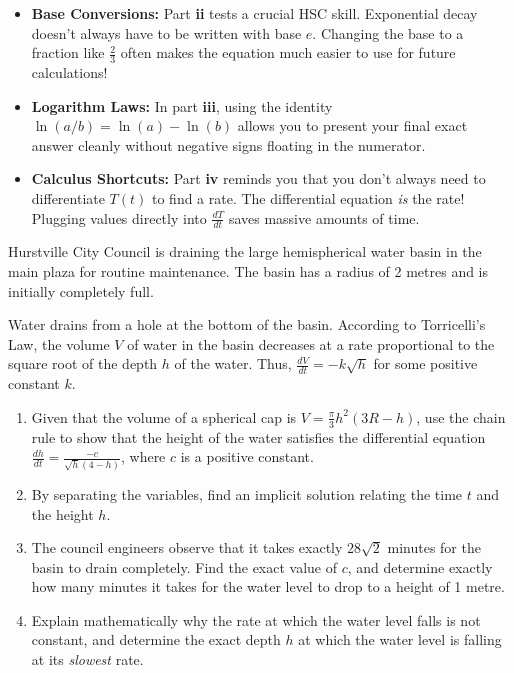 \begin{takeaways}
\begin{itemize}[leftmargin=*]
    \item \textbf{Base Conversions:} Part \textbf{ii} tests a crucial HSC skill. Exponential decay doesn't always have to be written with base $e$. Changing the base to a fraction like $\frac{2}{3}$ often makes the equation much easier to use for future calculations!
    \item \textbf{Logarithm Laws:} In part \textbf{iii}, using the identity $\ln(a/b) = \ln(a) - \ln(b)$ allows you to present your final exact answer cleanly without negative signs floating in the numerator.
    \item \textbf{Calculus Shortcuts:} Part \textbf{iv} reminds you that you don't always need to differentiate $T(t)$ to find a rate. The differential equation \textit{is} the rate! Plugging values directly into $\frac{dT}{dt}$ saves massive amounts of time.
\end{itemize}
\end{takeaways}

\begin{problem}
Hurstville City Council is draining the large hemispherical water basin in the main plaza for routine maintenance. The basin has a radius of 2 metres and is initially completely full.

Water drains from a hole at the bottom of the basin. According to Torricelli's Law, the volume $V$ of water in the basin decreases at a rate proportional to the square root of the depth $h$ of the water. Thus, $\frac{dV}{dt} = -k\sqrt{h}$ for some positive constant $k$.

\begin{enumerate}
    \item[\textbf{i}] Given that the volume of a spherical cap is $V = \frac{\pi}{3}h^2(3R - h)$, use the chain rule to show that the height of the water satisfies the differential equation $\frac{dh}{dt} = \frac{-c}{\sqrt{h}(4-h)}$, where $c$ is a positive constant.
    \item[\textbf{ii}] By separating the variables, find an implicit solution relating the time $t$ and the height $h$.
    \item[\textbf{iii}] The council engineers observe that it takes exactly $28\sqrt{2}$ minutes for the basin to drain completely. Find the exact value of $c$, and determine exactly how many minutes it takes for the water level to drop to a height of 1 metre.
    \item[\textbf{iv}] Explain mathematically why the rate at which the water level falls is not constant, and determine the exact depth $h$ at which the water level is falling at its \textit{slowest} rate.
\end{enumerate}
\end{problem}

